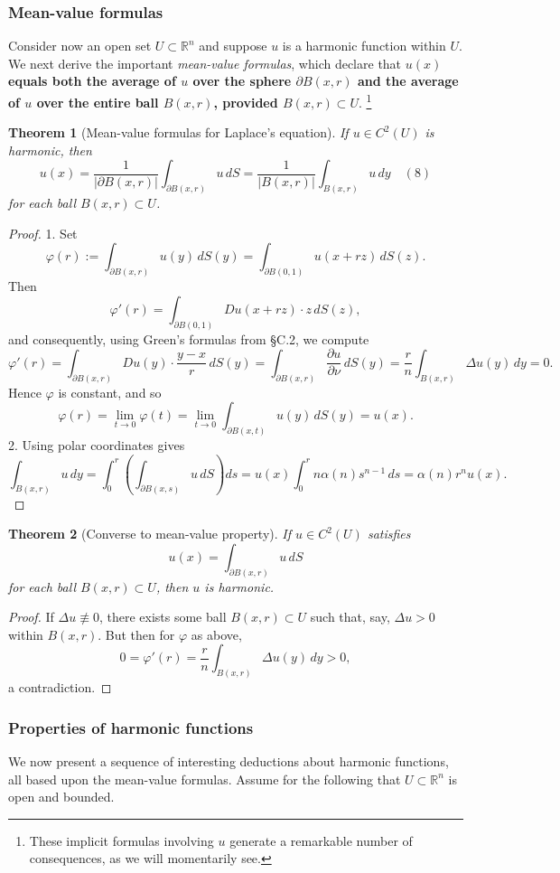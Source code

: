 \documentclass[a4paper,12pt]{report}
\newtheorem{theorem}{Theorem}[section]
\begin{document}
\subsubsection{Mean-value formulas}
Consider now an open set $U \subset \mathbb{R}^n$ and suppose $u$ is a harmonic function within $U$. We next derive the important \textit{mean-value formulas}, which declare that \textbf{$u(x)$ equals both the average of $u$ over the sphere $\partial B(x, r)$ and the average of $u$ over the entire ball $B(x, r)$, provided $B(x, r) \subset U$}. \footnote{These implicit formulas involving $u$ generate a remarkable number of consequences, as we will momentarily see.}
\begin{theorem}[Mean-value formulas for Laplace's equation]
    If $u \in C^2(U)$ is harmonic, then
    \[
        u(x) = \frac{1}{|\partial B(x, r)|} \int_{\partial B(x, r)} u \, dS = \frac{1}{|B(x, r)|} \int_{B(x, r)} u \, dy \quad (8)
    \]
    for each ball $B(x, r) \subset U$.
\end{theorem}
\begin{proof}
1. Set
\[
\varphi(r) := \int_{\partial B(x,r)} u(y) \, dS(y) = \int_{\partial B(0,1)} u(x + rz) \, dS(z).
\]
Then
\[
\varphi'(r) = \int_{\partial B(0,1)} Du(x + rz) \cdot z \, dS(z),
\]
and consequently, using Green's formulas from \S C.2, we compute
\[
\varphi'(r) = \int_{\partial B(x,r)} Du(y) \cdot \frac{y - x}{r} \, dS(y)
= \int_{\partial B(x,r)} \frac{\partial u}{\partial \nu} \, dS(y)
= \frac{r}{n} \int_{B(x,r)} \Delta u(y) \, dy = 0.
\]
Hence $\varphi$ is constant, and so
\[
\varphi(r) = \lim_{t \to 0} \varphi(t) = \lim_{t \to 0} \int_{\partial B(x,t)} u(y) \, dS(y) = u(x).
\]
2. Using polar coordinates gives
\[
\int_{B(x,r)} u \, dy = \int_0^r \left( \int_{\partial B(x,s)} u \, dS \right) ds 
= u(x) \int_0^r n\alpha(n) s^{n-1} \, ds = \alpha(n) r^n u(x).
\]
\end{proof}
\begin{theorem}[Converse to mean-value property]
If $u \in C^2(U)$ satisfies
\[
u(x) = \int_{\partial B(x,r)} u \, dS
\]
for each ball $B(x, r) \subset U$, then $u$ is harmonic.
\end{theorem}
\begin{proof}
If $\Delta u \not\equiv 0$, there exists some ball $B(x, r) \subset U$ such that, say, $\Delta u > 0$ within $B(x, r)$. But then for $\varphi$ as above,
\[
0 = \varphi'(r) = \frac{r}{n} \int_{B(x,r)} \Delta u(y) \, dy > 0,
\]
a contradiction.
\end{proof}
\subsubsection{Properties of harmonic functions}
We now present a sequence of interesting deductions about harmonic functions, all based upon the mean-value formulas. Assume for the following that \( U \subset \mathbb{R}^n \) is open and bounded.\\
\end{document}
